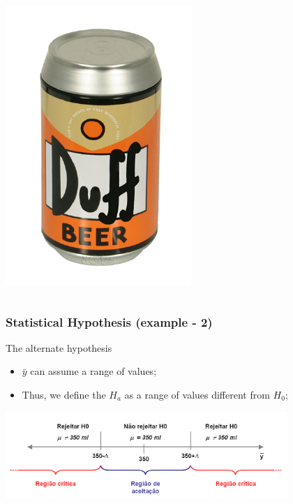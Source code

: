 \documentclass[10pt]{beamer}
\begin{document}
\begin{frame}
\begin{columns}[c]
      \includegraphics[width=1\textwidth]{img/duff}
    \end{columns}
\end{frame}

\begin{frame}
  \frametitle{Statistical Hypothesis (example - 2)}
  \begin{block}{The alternate hypothesis}
    \begin{itemize}
    \item $\bar{y}$ can assume a range of values;
    \item Thus, we define the $H_a$ as a range of values different
      from $H_0$;
    \end{itemize}
  \end{block}
  \bigskip
  \includegraphics[width=0.8\textwidth]{img/criticalregion}
\end{frame}
\end{document}
